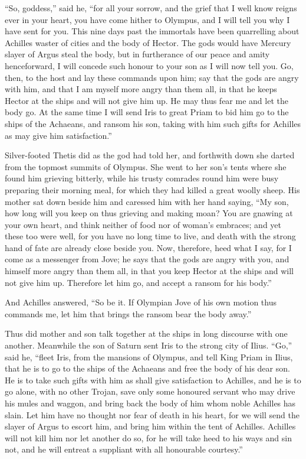 “So, goddess,” said he, “for all your sorrow, and the grief that I well
know reigns ever in your heart, you have come hither to Olympus, and I
will tell you why I have sent for you. This nine days past the immortals
have been quarrelling about Achilles waster of cities and the body of
Hector. The gods would have Mercury slayer of Argus steal the body, but in
furtherance of our peace and amity henceforward, I will concede such
honour to your son as I will now tell you. Go, then, to the host and lay
these commands upon him; say that the gods are angry with him, and that I
am myself more angry than them all, in that he keeps Hector at the ships
and will not give him up. He may thus fear me and let the body go. At the
same time I will send Iris to great Priam to bid him go to the ships of
the Achaeans, and ransom his son, taking with him such gifts for Achilles
as may give him satisfaction.”

Silver-footed Thetis did as the god had told her, and forthwith down she
darted from the topmost summits of Olympus. She went to her son’s tents
where she found him grieving bitterly, while his trusty comrades round him
were busy preparing their morning meal, for which they had killed a great
woolly sheep. His mother sat down beside him and caressed him with her
hand saying, “My son, how long will you keep on thus grieving and making
moan? You are gnawing at your own heart, and think neither of food nor of
woman’s embraces; and yet these too were well, for you have no long time
to live, and death with the strong hand of fate are already close beside
you. Now, therefore, heed what I say, for I come as a messenger from Jove;
he says that the gods are angry with you, and himself more angry than them
all, in that you keep Hector at the ships and will not give him up.
Therefore let him go, and accept a ransom for his body.”

And Achilles answered, “So be it. If Olympian Jove of his own motion thus
commands me, let him that brings the ransom bear the body away.”

Thus did mother and son talk together at the ships in long discourse with
one another. Meanwhile the son of Saturn sent Iris to the strong city of
Ilius. “Go,” said he, “fleet Iris, from the mansions of Olympus, and tell
King Priam in Ilius, that he is to go to the ships of the Achaeans and
free the body of his dear son. He is to take such gifts with him as shall
give satisfaction to Achilles, and he is to go alone, with no other
Trojan, save only some honoured servant who may drive his mules and
waggon, and bring back the body of him whom noble Achilles has slain. Let
him have no thought nor fear of death in his heart, for we will send the
slayer of Argus to escort him, and bring him within the tent of Achilles.
Achilles will not kill him nor let another do so, for he will take heed to
his ways and sin not, and he will entreat a suppliant with all honourable
courtesy.”

